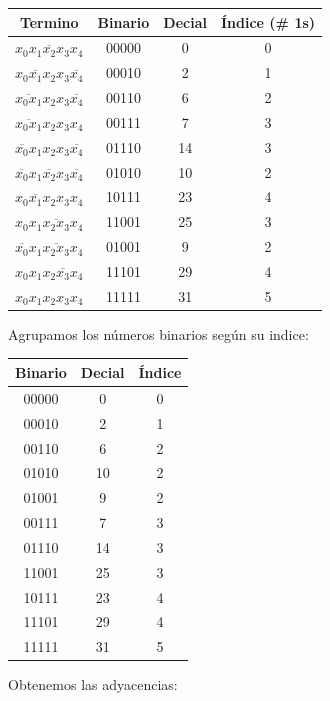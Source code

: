 \documentclass[a4paper,12pt]{article}
\begin{document}
\begin{enumerate}[label=\textcolor{teal}{\textbf{\arabic*.}}]
        \begin{table} [H]
            \centering
            \begin{tabular}{|c|c|c|c|}
                \hline
                Termino & Binario & Decial & Índice (\# 1s)\\ \hline
                $\overline{x_0 x_1 x_2 x_3 x_4}$  & 00000 & 0 & 0 \\ \hline
                $\overline{x_0 x_1 x_2} x_3 \overline{x_4}$  & 00010 & 2 & 1 \\ \hline  
                $\overline{x_0 x_1} x_2 x_3 \overline{x_4}$  & 00110 & 6 & 2 \\ \hline  
                $\overline{x_0 x_1} x_2 x_3 x_4$  & 00111 & 7 & 3 \\ \hline  
                $\overline{x_0} x_1 x_2 x_3 \overline{x_4}$  & 01110 & 14 & 3 \\ \hline  
                $\overline{x_0} x_1 \overline{x_2} x_3 \overline{x_4}$  & 01010 & 10 & 2 \\ \hline  
                $x_0 \overline{x_1} x_2 x_3 x_4$  & 10111 & 23 & 4 \\ \hline  
                $x_0 x_1 \overline{x_2 x_3} x_4$  & 11001 & 25 & 3 \\ \hline  
                $\overline{x_0} x_1 \overline{x_2 x_3} x_4$  & 01001 & 9 & 2 \\ \hline  
                $x_0 x_1 x_2 \overline{x_3} x_4$  & 11101 & 29 & 4 \\ \hline  
                $x_0 x_1 x_2 x_3 x_4$  & 11111 & 31 & 5 \\ \hline  
            \end{tabular}
        \end{table}
        Agrupamos los números binarios según su indice:\\
        \begin{table} [H]
            \centering
            \begin{tabular}{|c|c|c|}
                \hline
                Binario & Decial & Índice\\ \hline
                00000 & 0 & 0 \\ \hline
                00010 & 2 & 1 \\ \hline  
                00110 & 6 & 2 \\ \hline 
                01010 & 10 & 2 \\ \hline
                01001 & 9 & 2 \\ \hline  
                00111 & 7 & 3 \\ \hline  
                01110 & 14 & 3 \\ \hline  
                11001 & 25 & 3 \\ \hline    
                10111 & 23 & 4 \\ \hline  
                11101 & 29 & 4 \\ \hline  
                11111 & 31 & 5 \\ \hline  
            \end{tabular}
        \end{table}
        Obtenemos las adyacencias: \\


\end{enumerate}
\end{document}
